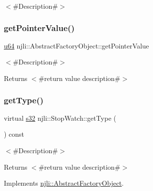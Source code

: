 $<$\#\+Description\#$>$ \mbox{\label{classnjli_1_1_stop_watch_a4ffddf141a426a5a07d0ac19f1913811}} 
\subsubsection{\texorpdfstring{get\+Pointer\+Value()}{getPointerValue()}}
{\footnotesize\ttfamily \mbox{\hyperlink{_util_8h_ad758b7a5c3f18ed79d2fcd23d9f16357}{u64}} njli\+::\+Abstract\+Factory\+Object\+::get\+Pointer\+Value}

$<$\#\+Description\#$>$

\begin{DoxyReturn}{Returns}
$<$\#return value description\#$>$ 
\end{DoxyReturn}
\mbox{\label{classnjli_1_1_stop_watch_a9f6f6c44d2c6137a8bb38720e2ccbfbc}} 
\subsubsection{\texorpdfstring{get\+Type()}{getType()}}
{\footnotesize\ttfamily virtual \mbox{\hyperlink{_util_8h_aa62c75d314a0d1f37f79c4b73b2292e2}{s32}} njli\+::\+Stop\+Watch\+::get\+Type (\begin{DoxyParamCaption}{ }\end{DoxyParamCaption}) const\hspace{0.3cm}{\ttfamily [virtual]}}

$<$\#\+Description\#$>$

\begin{DoxyReturn}{Returns}
$<$\#return value description\#$>$ 
\end{DoxyReturn}


Implements \mbox{\hyperlink{classnjli_1_1_abstract_factory_object_a207c86146d40d0794708ae7f2d4e60a7}{njli\+::\+Abstract\+Factory\+Object}}.

\mbox{\label{classnjli_1_1_stop_watch_a63dc587580584f4574df3830c84b1da1}} 
